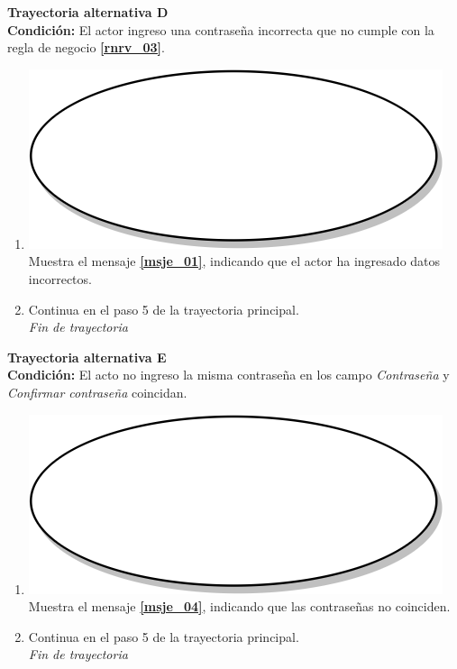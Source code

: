 \textbf{Trayectoria alternativa D} \label{cu2_ta_d}\\
\textbf{Condición:} El actor ingreso una contraseña incorrecta que no cumple con la regla de negocio \textbf{\ref{rnrv_03}}.\\
 \begin{enumerate}[label=D\arabic*]
    \item {\includegraphics[scale=.05]{Capitulo3/img/proceso.png} Muestra el mensaje \textbf{\ref{msje_01}}, indicando que el actor ha ingresado datos incorrectos.}
    \item {Continua en el paso 5 de la trayectoria principal.} \\
    \textit{Fin de trayectoria} \\
\end{enumerate}

\textbf{Trayectoria alternativa E} \label{cu2_ta_e}\\
\textbf{Condición:} El acto no ingreso la misma contraseña en los campo \textit{Contraseña} y \textit{Confirmar contraseña} coincidan.\\
 \begin{enumerate}[label=E\arabic*]
    \item {\includegraphics[scale=.05]{Capitulo3/img/proceso.png} Muestra el mensaje \textbf{\ref{msje_04}}, indicando que las contraseñas no coinciden.}
    \item {Continua en el paso 5 de la trayectoria principal.} \\
    \textit{Fin de trayectoria} \\
\end{enumerate}

